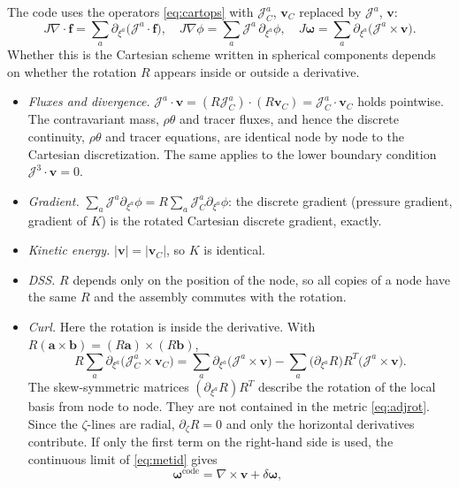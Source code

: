 \documentclass[11pt,a4paper]{article}
\newcommand{\vv}{\bm{v}}
\newcommand{\Jm}{\mathcal{J}}
\begin{document}
The code uses the operators \eqref{eq:cartops} with $\Jm^a_C$, $\vv_C$
replaced by $\Jm^a$, $\vv$:
\begin{equation}
  J\nabla\cdot\bm f = \sum_{a}\partial_{\xi^a}\bigl(\Jm^a\cdot\bm f\bigr),\quad
  J\nabla\phi = \sum_a \Jm^a\,\partial_{\xi^a}\phi,\quad
  J\bm\omega = \sum_a \partial_{\xi^a}\bigl(\Jm^a\times\vv\bigr).
  \label{eq:metricops}
\end{equation}
Whether this is the Cartesian scheme written in spherical components depends
on whether the rotation $R$ appears inside or outside a derivative.
\begin{itemize}
\item \emph{Fluxes and divergence.}
  $\Jm^a\cdot\vv = (R\Jm^a_C)\cdot(R\vv_C) = \Jm^a_C\cdot\vv_C$ holds
  pointwise. The contravariant mass, $\rho\theta$ and tracer fluxes, and
  hence the discrete continuity, $\rho\theta$ and tracer equations, are
  identical node by node to the Cartesian discretization. The same applies to
  the lower boundary condition $\Jm^3\cdot\vv = 0$.
\item \emph{Gradient.}
  $\sum_a\Jm^a\partial_{\xi^a}\phi = R\sum_a\Jm^a_C\partial_{\xi^a}\phi$:
  the discrete gradient (pressure gradient, gradient of $K$) is the rotated
  Cartesian discrete gradient, exactly.
\item \emph{Kinetic energy.} $|\vv| = |\vv_C|$, so $K$ is identical.
\item \emph{DSS.} $R$ depends only on the position of the node, so all
  copies of a node have the same $R$ and the assembly commutes with the
  rotation.
\item \emph{Curl.} Here the rotation is inside the derivative. With
  $R(\bm a\times\bm b) = (R\bm a)\times(R\bm b)$,
  \begin{equation}
    R\sum_a\partial_{\xi^a}\bigl(\Jm^a_C\times\vv_C\bigr)
    = \sum_a\partial_{\xi^a}\bigl(\Jm^a\times\vv\bigr)
     - \sum_a\bigl(\partial_{\xi^a}R\bigr)R^T\bigl(\Jm^a\times\vv\bigr).
    \label{eq:curlrot}
  \end{equation}
  The skew-symmetric matrices $(\partial_{\xi^a}R)R^T$ describe the rotation
  of the local basis from node to node. They are not contained in the
  metric \eqref{eq:adjrot}. Since the $\zeta$-lines are radial,
  $\partial_\zeta R = 0$ and only the horizontal derivatives contribute. If
  only the first term on the right-hand side is used, the continuous limit
  of \eqref{eq:metid} gives
  \begin{equation}
    \bm\omega^{\text{code}} = \nabla\times\vv + \delta\bm\omega,\qquad

\end{equation}
\end{itemize}
\end{document}
